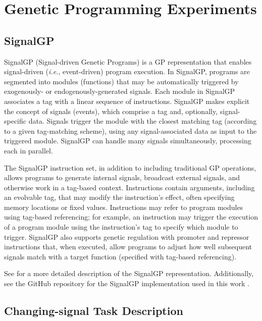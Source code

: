 \section{Genetic Programming Experiments}
\label{sec:gpsupplement}


\subsection{SignalGP}

SignalGP (Signal-driven Genetic Programs) is a GP representation that enables signal-driven (\textit{i.e.}, event-driven) program execution.
In SignalGP, programs are segmented into modules (functions) that may be automatically triggered by exogenously- or endogenously-generated signals.
Each module in SignalGP associates a tag with a linear sequence of instructions.
SignalGP makes explicit the concept of signals (events), which comprise a tag and, optionally, signal-specific data.
Signals trigger the module with the closest matching tag (according to a given tag-matching scheme), using any signal-associated data as input to the triggered module.
SignalGP can handle many signals simultaneously, processing each in parallel.

The SignalGP instruction set, in addition to including traditional GP operations, allows programs to generate internal signals, broadcast external signals, and otherwise work in a tag-based context.
Instructions contain arguments, including an evolvable tag, that may modify the instruction's effect, often specifying memory locations or fixed values.
Instructions may refer to program modules using tag-based referencing; for example, an instruction may trigger the execution of a program module using the instruction's tag to specify which module to trigger.
SignalGP also supports genetic regulation with promoter and repressor instructions that, when executed, allow programs to adjust how well subsequent signals match with a target function (specified with tag-based referencing).

See  for a more detailed description of the SignalGP representation. Additionally, see the GitHub repository for the SignalGP implementation used in this work .

\subsection{Changing-signal Task Description}

